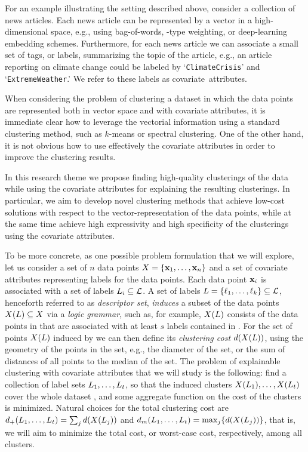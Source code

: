 \documentclass[a4paper,11pt]{article}
\begin{document}
For an example illustrating the setting described above, 
consider a collection of news articles. 
Each news article can be represented by a vector in a high-dimensional space, 
e.g., using bag-of-words, \tfidf-type weighting, or deep-learning embedding schemes. 
Furthermore, for each news article we can associate a small 
set of tags, or labels, summarizing the topic of the article, 
e.g., an article reporting on climate change could be labeled by
`\texttt{\small ClimateCrisis}' and `\texttt{\small ExtremeWeather}.'
We refer to these labels as covariate~attributes.

When considering the problem of clustering a dataset in which the data points are 
represented both in vector space and with covariate attributes, 
it is immediate clear how to leverage the vectorial information
using a standard clustering method, such as $k$-means or spectral clustering. 
One of the other hand, it is not obvious how to use effectively the 
covariate attributes in order to improve the clustering results. 

In this research theme we propose finding high-quality clusterings of the data
while using the covariate attributes for explaining the resulting clusterings. 
In particular, we aim to develop novel clustering methods
that achieve low-cost solutions with respect to the vector-representation of the data points, 
while at the same time achieve high expressivity and high specificity of the clusterings
using the covariate attributes. 

To be more concrete, as one possible problem formulation that we will explore, 
let us consider a set of $n$ data points $X=\{\mathbf{x}_1,\ldots,\mathbf{x}_n\}$
and a set of covariate attributes {} representing labels for the data points. 
Each data point $\mathbf{x}_i$ is associated with a set of labels ${L}_i\subseteq\mathcal{L}$. 
A set of labels ${L}=\{{\ell}_1,\ldots,{\ell}_k\}\subseteq\mathcal{L}$, 
henceforth referred to as \emph{descriptor set}, 
\emph{induces} a subset of the data points $X({L})\subseteq X$
via a \emph{logic grammar}, such as, for example, 
$X({L})$ consists of the data points in \dataset that 
are associated with at least $s$ labels contained in .
For the set of points $X({L})$ induced by  
we can then define its \emph{clustering cost} $d(X({L}))$, 
using the geometry of the points in the set, 
e.g., the diameter of the set, or the sum of distances of all points to the median of the set.
The problem of explainable clustering with covariate attributes that we will study is the following: 
find a collection of label sets ${L}_1,\ldots,{L}_t$, 
so that the induced clusters $X({L}_1),\ldots,X({L}_t)$
cover the whole dataset \dataset, 
and some aggregate function on the cost of the clusters is minimized. 
Natural choices for the total clustering cost are
$d_{+}({L}_1,\ldots,{L}_t) = \sum_{j} d(X({L}_j))$ and 
$d_{m}({L}_1,\ldots,{L}_t) = \max_{j}\! \left\{ d(X({L}_j)) \right\}$, 
that is, we will aim to minimize the total cost, or worst-case cost, respectively, 
among all clusters. 
\end{document}

